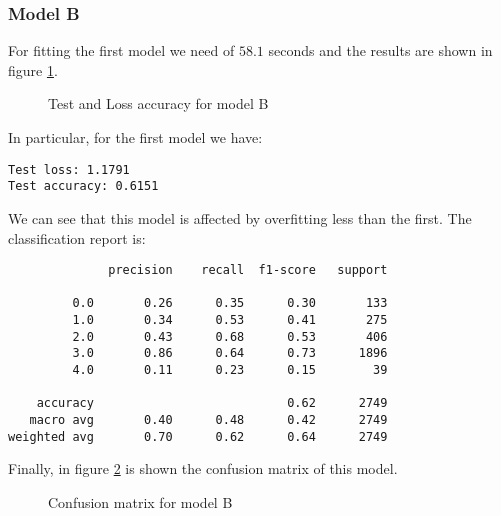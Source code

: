 \subsubsection{Model B}
For fitting the first model we need of $58.1$ seconds and the results are shown in figure \ref{fig:testB}.
\begin{figure}[h!]
    \testB
    \caption{Test and Loss accuracy for model B}
    \label{fig:testB}
\end{figure}
In particular, for the first model we have:
\begin{verbatim}
Test loss: 1.1791
Test accuracy: 0.6151
\end{verbatim}
We can see that this model is affected by overfitting less than the first.
The classification report is:
\begin{verbatim}
              precision    recall  f1-score   support

         0.0       0.26      0.35      0.30       133
         1.0       0.34      0.53      0.41       275
         2.0       0.43      0.68      0.53       406
         3.0       0.86      0.64      0.73      1896
         4.0       0.11      0.23      0.15        39

    accuracy                           0.62      2749
   macro avg       0.40      0.48      0.42      2749
weighted avg       0.70      0.62      0.64      2749
\end{verbatim}
Finally, in figure \ref{fig:CMB} is shown the confusion matrix of this model.
\begin{figure}[h!]
    \CMB
    \caption{Confusion matrix for model B}
    \label{fig:CMB}
\end{figure}